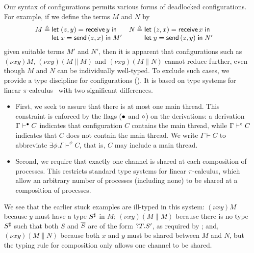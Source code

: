 \documentclass[oribibl,orivec,envcountsame]{llncs}
\begin{document}
Our syntax of configurations permits various forms of deadlocked configurations.  For example, if we
define the terms $M$ and $N$ by
\begin{align*}
  M &\defeq \bl
    \gvlet{(z,y)}{\gvreceive{y}}{} \\
    \gvlet{x}{\gvsend{(z,x)}}{M'} \el &
  N &\defeq \bl
    \gvlet{(z,x)}{\gvreceive{x}}{} \\
    \gvlet{y}{\gvsend{(z,y)}}{N'} \el
\end{align*}
given suitable terms $M'$ and $N'$, then it is apparent that configurations such as $(\nu xy)M$,
$(\nu xy)(M \parallel M)$ and $(\nu xy)(M \parallel N)$ cannot reduce further, even though $M$ and
$N$ can be individually well-typed.  To exclude such cases, we provide a type discipline for
configurations (). It is based on type systems for linear
$\pi$-calculus~\cite{Kobayashi96} with two significant differences.
\begin{itemize}
\item First, we seek to assure that there is at most one main thread. This constraint is enforced by
  the flags (${\mathord{\bullet}}$ and ${\mathord{\circ}}$) on the derivations: a derivation $\Gamma \vdash^{\mathord{\bullet}} C$
  indicates that configuration $C$ contains the main thread, while $\Gamma \vdash^{\mathord{\circ}} C$
  indicates that $C$ does not contain the main thread. We write $\Gamma \vdash C$ to abbreviate
  $\exists \phi.\Gamma \vdash^\phi C$, that is, $C$ may include a main thread.
\item Second, we require that exactly one channel is shared at each composition of processes.  This
  restricts standard type systems for linear $\pi$-calculus, which allow an arbitrary number of
  processes (including none) to be shared at a composition of processes.
\end{itemize}
We see that the earlier stuck examples are ill-typed in this system: $(\nu xy)M$ because $y$ must
have a type $S^\sharp$ in $M$; $(\nu xy)(M \parallel M)$ because there is no type $S^\sharp$
such that both $S$ and $\overline{S}$ are of the form ${?T.S'}$, as required by
; and, $(\nu xy)(M \parallel N)$ because both $x$ and $y$ must be shared between
$M$ and $N$, but the typing rule for composition only allows one channel to be shared.
\end{document}
